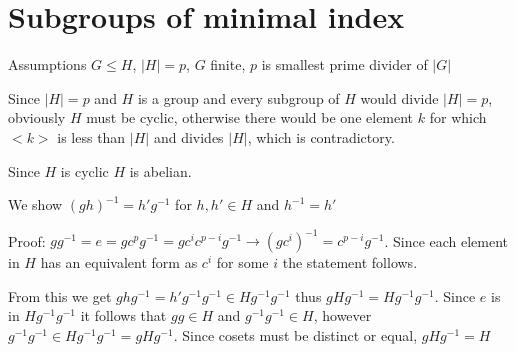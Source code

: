 \section{Subgroups of minimal index}
Assumptions $G \leq H$, $|H|=p$, $G$ finite, $p$ is smallest prime divider of $|G|$

Since $|H|=p$ and $H$ is a group and every subgroup of $H$ would divide $|H|=p$, obviously $H$ must be cyclic, otherwise there would be one element $k$ for which $<k>$ is less than $|H|$ and divides $|H|$, which is contradictory.

Since $H$ is cyclic $H$ is abelian.

We show $(gh)^{-1}=h'g^{-1}$ for $h,h' \in H$ and $h^{-1}=h'$

Proof: $gg^{-1}=e=gc^{p}g^{-1}=gc^{i}c^{p-i}g^{-1} \rightarrow (gc^i)^{-1}=c^{p-i}g^{-1}$. Since each element in $H$ has an equivalent form as $c^i$ for some $i$ the statement follows.

From this we get $ghg^{-1} = h'g^{-1}g^{-1} \in Hg^{-1}g^{-1}$ thus $gHg^{-1}=Hg^{-1}g^{-1}$. Since $e$ is in $Hg^{-1}g^{-1}$ it follows that $gg \in H$ and $g^{-1}g^{-1} \in H$, however $g^{-1}g^{-1} \in Hg^{-1}g^{-1}=gHg^{-1}$. Since cosets must be distinct or equal, $gHg^{-1}=H$